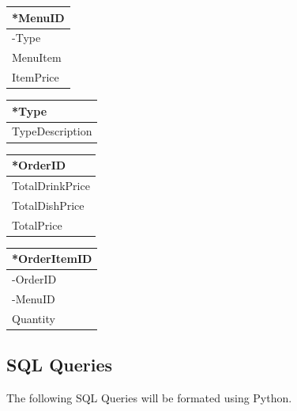 \begin{center}
\begin{tabular}{ | l |   }
    \hline
    \textbf{*MenuID} \\ \hline
	-Type\\
	MenuItem\\
	ItemPrice\\
	

     \hline
\end{tabular}
\label{tab:3nF}
\end{center}

\begin{center}
\begin{tabular}{ | l |   }
    \hline
    \textbf{*Type} \\ \hline

	TypeDescription\\
		
     \hline
\end{tabular}
\label{tab:3nF}
\end{center}

\begin{center}
\begin{tabular}{ | l |   }
    \hline
    \textbf{*OrderID} \\ \hline

	TotalDrinkPrice\\
	TotalDishPrice\\
	TotalPrice\\

     \hline
\end{tabular}
\label{tab:3nF}
\end{center}

\begin{center}
\begin{tabular}{ | l |   }
    \hline
    \textbf{*OrderItemID} \\ \hline

	-OrderID\\
	-MenuID\\
	Quantity \\
		
     \hline
\end{tabular}
\label{tab:3nF}
\end{center}



\subsection{SQL Queries} 
The following SQL Queries will be formated using Python.

